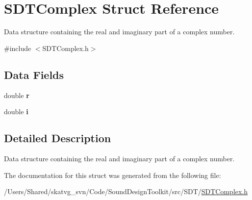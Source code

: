 \hypertarget{struct_s_d_t_complex}{}\section{S\+D\+T\+Complex Struct Reference}
\label{struct_s_d_t_complex}


Data structure containing the real and imaginary part of a complex number.  




{\ttfamily \#include $<$S\+D\+T\+Complex.\+h$>$}

\subsection*{Data Fields}
\begin{DoxyCompactItemize}
\item 
\hypertarget{struct_s_d_t_complex_a880a49112fedae68e714341a9a082fb6}{}double {\bfseries r}\label{struct_s_d_t_complex_a880a49112fedae68e714341a9a082fb6}

\item 
\hypertarget{struct_s_d_t_complex_a5659a38afd08966e6799fa0fb40a882a}{}double {\bfseries i}\label{struct_s_d_t_complex_a5659a38afd08966e6799fa0fb40a882a}

\end{DoxyCompactItemize}


\subsection{Detailed Description}
Data structure containing the real and imaginary part of a complex number. 

The documentation for this struct was generated from the following file\+:\begin{DoxyCompactItemize}
\item 
/\+Users/\+Shared/skatvg\+\_\+svn/\+Code/\+Sound\+Design\+Toolkit/src/\+S\+D\+T/\hyperlink{_s_d_t_complex_8h}{S\+D\+T\+Complex.\+h}\end{DoxyCompactItemize}
